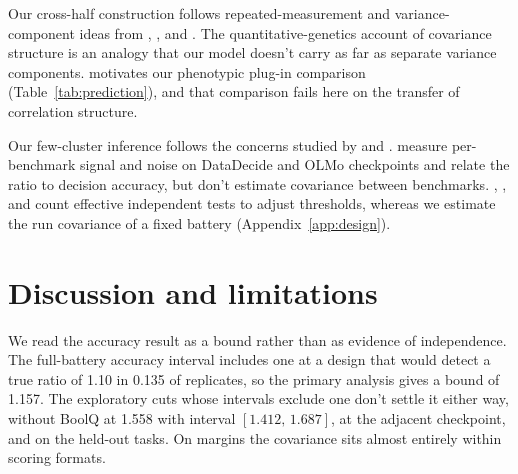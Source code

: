 \documentclass{article}
\newcommand{\ci}[2]{\ensuremath{[#1,\,#2]}}
\begin{document}
Our cross-half construction follows repeated-measurement and variance-component ideas from \citet{spearman1904}, \citet{cronbach1951}, and \citet{searle1992}. The quantitative-genetics account of covariance structure \citep{martin1977} is an analogy that our model doesn't carry as far as separate variance components. \citet{cheverud1988} motivates our phenotypic plug-in comparison (Table~\ref{tab:prediction}), and that comparison fails here on the transfer of correlation structure.

Our few-cluster inference follows the concerns studied by \citet{cameron2008} and \citet{mackinnon2017}. \citet{heineman2025} measure per-benchmark signal and noise on DataDecide and OLMo checkpoints and relate the ratio to decision accuracy, but don't estimate covariance between benchmarks. \citet{cheverud2001}, \citet{nyholt2004}, and \citet{li2005} count effective independent tests to adjust thresholds, whereas we estimate the run covariance of a fixed battery (Appendix~\ref{app:design}).

\section{Discussion and limitations}
We read the accuracy result as a bound rather than as evidence of independence. The full-battery accuracy interval includes one at a design that would detect a true ratio of 1.10 in 0.135 of replicates, so the primary analysis gives a bound of 1.157. The exploratory cuts whose intervals exclude one don't settle it either way, without BoolQ at 1.558 with interval \ci{1.412}{1.687}, at the adjacent checkpoint, and on the held-out tasks. On margins the covariance sits almost entirely within scoring formats.
\end{document}
